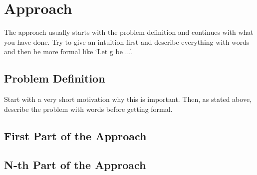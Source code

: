 \chapter{Approach}
\label{chap:approach}
The approach usually starts with the problem definition and continues with what you
have done. Try to give an intuition first and describe everything with words and then
be more formal like ‘Let g be ...’.

\section{Problem Definition}

Start with a very short motivation why this is important. Then, as stated above,
describe the problem with words before getting formal.

\section{First Part of the Approach}

\section{N-th Part of the Approach}